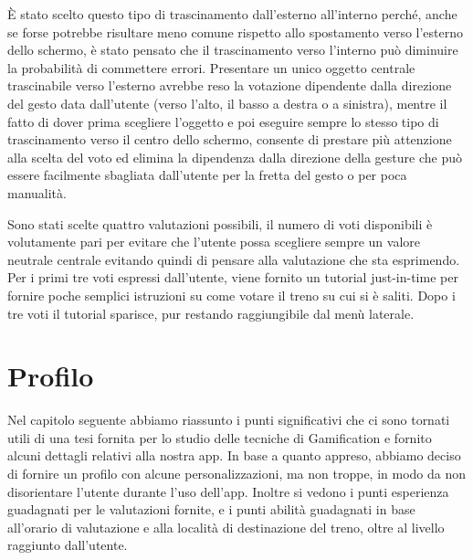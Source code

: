 È stato scelto questo tipo di trascinamento dall'esterno all'interno perché, anche se forse potrebbe risultare meno comune rispetto allo spostamento verso l'esterno dello schermo, è stato pensato che il trascinamento verso l'interno può diminuire la probabilità di commettere errori. Presentare un unico oggetto centrale trascinabile verso l'esterno avrebbe reso la votazione dipendente dalla direzione del gesto data dall'utente (verso l'alto, il basso a destra o a sinistra), mentre il fatto di dover prima scegliere l'oggetto e poi eseguire sempre lo stesso tipo di trascinamento verso il centro dello schermo, consente di prestare più attenzione alla scelta del voto ed elimina la dipendenza dalla direzione della gesture che può essere facilmente sbagliata dall'utente per la fretta del gesto o per poca manualità. 

Sono stati scelte quattro valutazioni possibili, il numero di voti disponibili è volutamente pari per evitare che l'utente possa scegliere sempre un valore neutrale centrale evitando quindi di pensare alla valutazione che sta esprimendo. 
Per i primi tre voti espressi dall'utente, viene fornito un tutorial just-in-time per fornire poche semplici istruzioni su come votare il treno su cui si è saliti.
Dopo i tre voti il tutorial sparisce, pur restando raggiungibile dal menù laterale.

\section{Profilo\label{sec:profilo}}
Nel capitolo seguente abbiamo riassunto i punti significativi che ci sono tornati utili di una tesi fornita per lo studio delle tecniche di Gamification e fornito alcuni dettagli relativi alla nostra app.
In base a quanto appreso, abbiamo deciso di fornire un profilo con alcune personalizzazioni, ma non troppe, in modo da non disorientare l'utente durante l'uso dell'app.
Inoltre si vedono i punti esperienza guadagnati per le valutazioni fornite, e i punti abilità guadagnati in base all'orario di valutazione e alla località di destinazione del treno, oltre al livello raggiunto dall'utente.